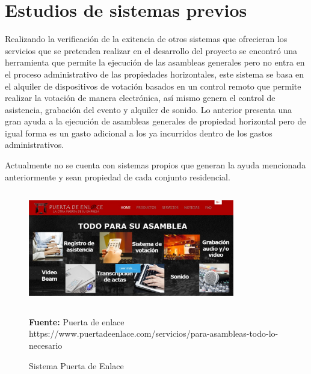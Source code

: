 \section{Estudios de sistemas previos}

Realizando la verificación de la exitencia de otros sistemas que ofrecieran los servicios que se pretenden realizar en el desarrollo del proyecto se encontró una herramienta que permite la ejecución de las asambleas generales pero no entra en el proceso administrativo de las propiedades horizontales, este sistema se basa en el alquiler de dispositivos de votación basados en un control remoto que permite realizar la votación de manera electrónica, así mismo genera el control de asistencia, grabación del evento y alquiler de sonido. Lo anterior presenta una gran ayuda a la ejecución de asambleas generales de propiedad horizontal pero de igual forma es un gasto adicional a los ya incurridos dentro de los gastos administrativos.

Actualmente no se cuenta con sistemas propios que generan la ayuda mencionada anteriormente y sean propiedad de cada conjunto residencial.

\vspace{1.5cm}

\begin{figure}[th!]
	\centering
	\includegraphics[width=9cm,height=5cm]{contexto/proyecto/imgs/puerta_enlace.jpg}
	\caption{Sistema Puerta de Enlace}{\scriptsize \textbf{Fuente:} Puerta de enlace  https://www.puertadeenlace.com/servicios/para-asambleas-todo-lo-necesario}
\end{figure}

\newpage